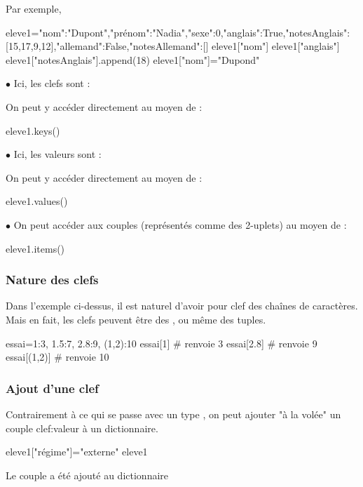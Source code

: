 \documentclass[11pt,a4paper,french,twoside]{PMCours}
\begin{document}
Par exemple,
\begin{Python}
eleve1={"nom":"Dupont","prénom":"Nadia","sexe":0,"anglais":True,"notesAnglais":[15,17,9,12],"allemand":False,"notesAllemand":[]}
eleve1["nom"]
eleve1["anglais"]
eleve1["notesAnglais"].append(18)
eleve1["nom"]="Dupond"
\end{Python}

$\bullet$ Ici, les clefs sont :


On peut y accéder directement au moyen de :
\begin{Python}
eleve1.keys()
\end{Python}

$\bullet$ Ici, les valeurs sont :


On peut y accéder directement au moyen de :
\begin{Python}
eleve1.values()
\end{Python}

$\bullet$ On peut accéder aux couples  (représentés comme des 
2-uplets) au moyen de  : 
\begin{Python}
eleve1.items()
\end{Python}
\subsubsection*{Nature des clefs}
Dans l'exemple ci-dessus, il est naturel d'avoir pour clef des chaînes de caractères. \\
Mais en fait, les clefs peuvent être des ,  ou même des tuples.
\begin{Python}
essai={1:3, 1.5:7, 2.8:9, (1,2):10}
essai[1]         # renvoie 3
essai[2.8]       # renvoie 9
essai[(1,2)]     # renvoie 10
\end{Python}
\subsubsection*{Ajout d'une clef}
Contrairement à ce qui se passe avec un type , on peut ajouter "à la volée" un 
couple clef:valeur à un dictionnaire.

\begin{Python}
eleve1["régime"]="externe"
eleve1
\end{Python}
Le couple  a été ajouté au dictionnaire  
\end{document}
